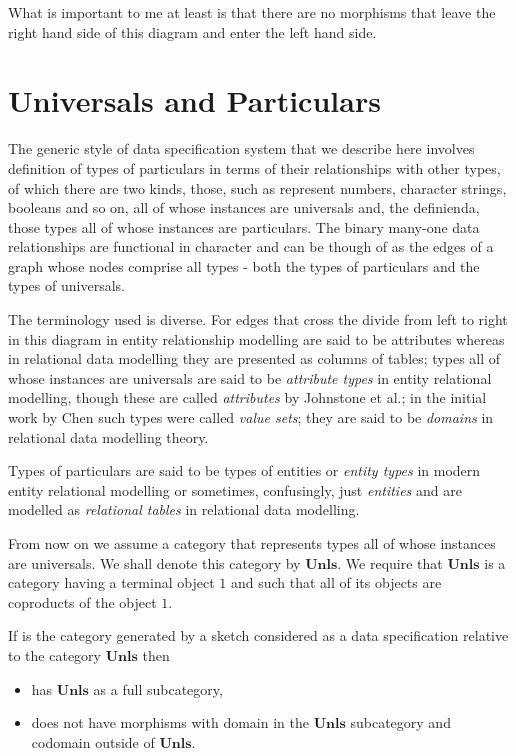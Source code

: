\documentclass[10pt,a4paper]{article}
\theoremstyle{remark}
\begin{document}
What is important to me at least is that there are no morphisms that leave the right hand side of this diagram and enter the left hand side.


\section{Universals and Particulars}
The generic style of data specification system
that we describe here involves definition of types of particulars in terms of their relationships with other types,
of which there are two kinds, those, such as represent numbers, character strings, booleans and so on, all of
whose instances are universals and, the definienda, those types all of whose instances are particulars. The binary many-one data relationships  are functional in character and can be though of as the edges of a graph whose nodes comprise all types - both the types of particulars and the types of universals. 


The terminology used is diverse. For edges that cross the divide from left to right in this diagram 
in entity relationship modelling 
are said to be attributes whereas in relational data modelling they are presented as columns of tables; types all of whose instances are universals  are said to be \textit{attribute types} in entity relational 
modelling, though  these are called \textit{attributes} by Johnstone et al.; in the initial work by  Chen such types were called \textit{value sets}; they are said to be \textit{domains} in relational data modelling theory. 

\newcommand{\Veee}{V}
\newcommand{\veee}{v}
Types of particulars are said to be 
types of entities or \textit{entity types} in modern entity relational modelling
or sometimes, confusingly, just \textit{entities}  and 
are modelled as \textit{relational tables} in relational data modelling. 

\newcommand{\universals}{\textbf{Unls}}


From now on we  assume a category that represents types all of whose instances are universals. 
We shall denote this category by $\universals$. 
We require that $\universals$ is a category having a terminal object $1$ and such that all of its objects 
are coproducts of the object $1$. 

If \catcw is the category generated by a sketch considered as a data specification relative to 
the category $\universals$  then 
\begin{itemize}
\item \catcw has $\universals$ as a full subcategory,
\item \catcw does not have morphisms with domain in the $\universals$ subcategory 
and codomain outside of $\universals$.
\end{itemize}
\end{document}
